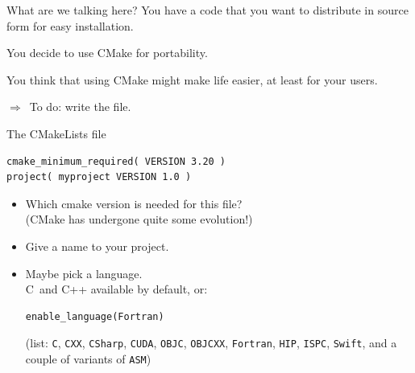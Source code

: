 

\begin{numberedframe}{What are we talking here?}
  You have a code that you want to distribute in source form
  for easy installation.

  You decide to use CMake for portability.

  You think that using CMake might make life easier,
  at least for your users.

  $\Rightarrow$~To do: write the  file.
\end{numberedframe}

\lstset{language=CMake}
\lstset{style=greencode}

\begin{numberedframe}{The CMakeLists file}
\begin{lstlisting}
cmake_minimum_required( VERSION 3.20 )
project( myproject VERSION 1.0 )
\end{lstlisting}
  \begin{itemize}
  \item Which cmake version is needed for this file?\\
    (CMake has undergone quite some evolution!)
  \item Give a name to your project.
  \item Maybe pick a language.\\
    C~and C++ available by default, or:
\begin{lstlisting}
enable_language(Fortran)
\end{lstlisting}
(list: \lstinline{C}, \lstinline{CXX}, \lstinline{CSharp}, \lstinline{CUDA}, \lstinline{OBJC},
\lstinline{OBJCXX}, \lstinline{Fortran}, \lstinline{HIP}, \lstinline{ISPC}, \lstinline{Swift},
and a couple of variants of \lstinline{ASM})
  \end{itemize}
\end{numberedframe}

